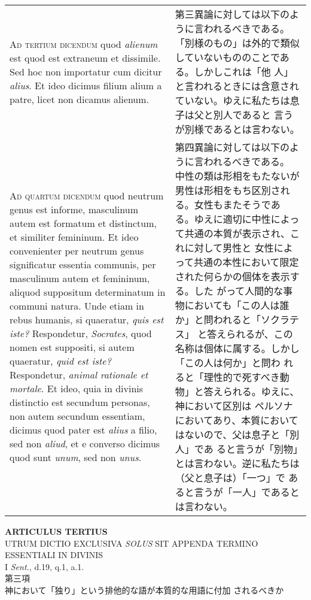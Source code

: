 \documentclass[10pt]{jsarticle} %
\begin{document}
\begin{longtable}{p{21em}p{21em}}
\\



{\scshape Ad tertium dicendum} quod {\itshape alienum} est quod est extraneum et
dissimile. Sed hoc non importatur cum dicitur {\itshape alius}. Et ideo dicimus
filium alium a patre, licet non dicamus alienum.


&

第三異論に対しては以下のように言われるべきである。
「別様のもの」は外的で類似していないもののことである。しかしこれは「他
 人」と言われるときには含意されていない。ゆえに私たちは息子は父と別人であると
 言うが別様であるとは言わない。


\\



{\scshape Ad quartum dicendum} quod neutrum genus est informe, masculinum autem
est formatum et distinctum, et similiter femininum. Et ideo
convenienter per neutrum genus significatur essentia communis, per
masculinum autem et femininum, aliquod suppositum determinatum in
communi natura. Unde etiam in rebus humanis, si quaeratur, {\itshape quis est
iste?} Respondetur, {\itshape Socrates}, quod nomen est suppositi, si autem
quaeratur, {\itshape quid est iste?} Respondetur, {\itshape animal rationale et mortale}. Et
ideo, quia in divinis distinctio est secundum personas, non autem
secundum essentiam, dicimus quod pater est {\itshape alius} a filio, sed non
{\itshape aliud}, et e converso dicimus quod sunt {\itshape unum}, sed non {\itshape unus}.


&

第四異論に対しては以下のように言われるべきである。
中性の類は形相をもたないが男性は形相をもち区別される。女性もまたそうであ
 る。ゆえに適切に中性によって共通の本質が表示され、これに対して男性と
 女性によって共通の本性において限定された何らかの個体を表示する。した
 がって人間的な事物においても「この人は誰か」と問われると「ソクラテス」
 と答えられるが、この名称は個体に属する。しかし「この人は何か」と問わ
 れると「理性的で死すべき動物」と答えられる。ゆえに、神において区別は
 ペルソナにおいてあり、本質においてはないので、父は息子と「別人」であ
 ると言うが「別物」とは言わない。逆に私たちは（父と息子は）「一つ」で
 あると言うが「一人」であるとは言わない。



\end{longtable}
\newpage




\begin{center}
{\Large {\bf ARTICULUS TERTIUS}}\\
{\large UTRUM DICTIO EXCLUSIVA {\itshape SOLUS} SIT APPENDA TERMINO
 ESSENTIALI IN DIVINIS}\\
{\footnotesize I {\itshape Sent.}, d.19, q.1, a.1.}\\
{\Large 第三項\\神において「独り」という排他的な語が本質的な用語に付加
 されるべきか}
\end{center}
\end{document}
